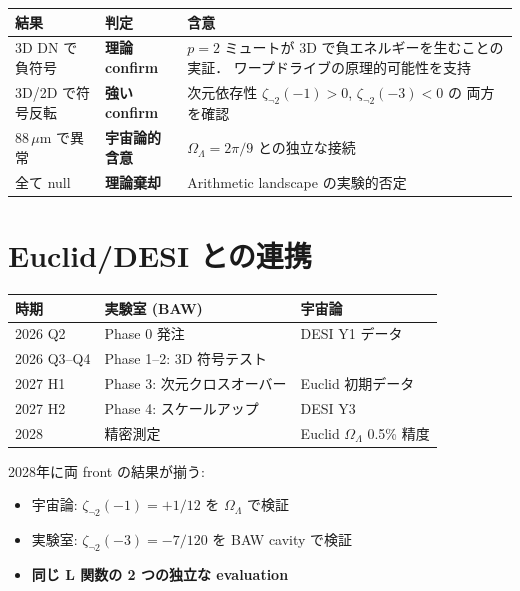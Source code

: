 \documentclass[11pt,a4paper]{article}
\begin{document}
\begin{center}
\begin{tabular}{llp{7cm}}
\toprule
結果 & 判定 & 含意 \\
\midrule
3D DN で負符号 & \textbf{理論 confirm} &
  $p=2$ ミュートが 3D で負エネルギーを生むことの実証．
  ワープドライブの原理的可能性を支持 \\
3D/2D で符号反転 & \textbf{強い confirm} &
  次元依存性 $\zeta_{\neg 2}(-1) > 0$, $\zeta_{\neg 2}(-3) < 0$ の
  両方を確認 \\
88\,$\mu$m で異常 & \textbf{宇宙論的含意} &
  $\Omega_\Lambda = 2\pi/9$ との独立な接続 \\
全て null & \textbf{理論棄却} &
  Arithmetic landscape の実験的否定 \\
\bottomrule
\end{tabular}
\end{center}

\section{Euclid/DESI との連携}

\begin{center}
\begin{tabular}{lll}
\toprule
時期 & 実験室 (BAW) & 宇宙論 \\
\midrule
2026 Q2 & Phase 0 発注 & DESI Y1 データ \\
2026 Q3--Q4 & Phase 1--2: 3D 符号テスト & \\
2027 H1 & Phase 3: 次元クロスオーバー & Euclid 初期データ \\
2027 H2 & Phase 4: スケールアップ & DESI Y3 \\
2028 & 精密測定 & Euclid $\Omega_\Lambda$ 0.5\% 精度 \\
\bottomrule
\end{tabular}
\end{center}

\noindent
2028年に両 front の結果が揃う:
\begin{itemize}
\item 宇宙論: $\zeta_{\neg 2}(-1) = +1/12$ を $\Omega_\Lambda$ で検証
\item 実験室: $\zeta_{\neg 2}(-3) = -7/120$ を BAW cavity で検証
\item \textbf{同じ L 関数の 2 つの独立な evaluation}
\end{itemize}
\end{document}
